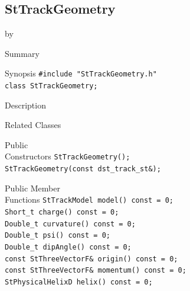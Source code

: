 \documentclass[twoside]{article}
\newcommand{\entrylabel}[1]{\mbox{\textbf{{#1}}}\hfil}%
\newenvironment{entry}
{\begin{list}{}%
    {\renewcommand{\makelabel}{\entrylabel}%
     \setlength{\labelwidth}{90pt}%
     \setlength{\leftmargin}{\labelwidth}
     \advance\leftmargin by \labelsep%
      }%
    }%
  {\end{list}}
\newcommand{\Entrylabel}[1]%
{\raisebox{0pt}[1ex][0pt]{\makebox[\labelwidth][l]%
    {\parbox[t]{\labelwidth}{\hspace{0pt}\textbf{{#1}}}}}}
\newenvironment{Entry}%
{\renewcommand{\entrylabel}{\Entrylabel}\begin{entry}}%
  {\end{entry}}
\begin{document}
\subsection{StTrackGeometry}
\label{sec:StTrackGeometry}
\begin{Entry}
\item[Summary]
\item[Synopsis]
    \verb+#include "StTrackGeometry.h"+\\
    \verb+class StTrackGeometry;+\\
\item[Description]
\item[Related Classes]
\item[Public\\ Constructors]
    \verb+StTrackGeometry();+\\
    \verb+StTrackGeometry(const dst_track_st&);+\\
\item[Public Member\\ Functions]
    \verb+StTrackModel model() const = 0;+\\
    \verb+Short_t charge() const = 0;+\\
    \verb+Double_t curvature() const = 0;+\\
    \verb+Double_t psi() const = 0;+\\
    \verb+Double_t dipAngle() const = 0;+\\
    \verb+const StThreeVectorF& origin() const = 0;+\\
    \verb+const StThreeVectorF& momentum() const = 0;+\\
    \verb+StPhysicalHelixD helix() const = 0;+\\
\end{Entry}
\clearpage
\end{document}
